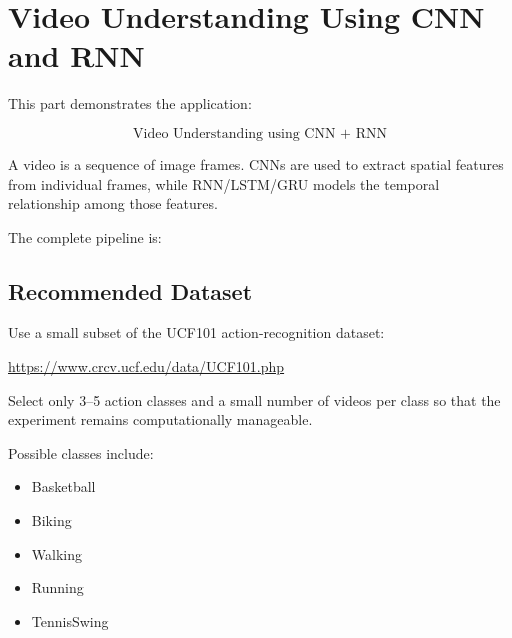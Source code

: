 \documentclass[10pt]{article}
\begin{document}
\section{Video Understanding Using CNN and RNN}

This part demonstrates the application:

\[
\boxed{\text{Video Understanding using CNN + RNN}}
\]

A video is a sequence of image frames. CNNs are used to extract spatial
features from individual frames, while RNN/LSTM/GRU models the temporal
relationship among those features.

The complete pipeline is:

\begin{center}
\end{center}

\subsection{Recommended Dataset}

Use a small subset of the UCF101 action-recognition dataset:

\url{https://www.crcv.ucf.edu/data/UCF101.php}

Select only 3--5 action classes and a small number of videos per class so that
the experiment remains computationally manageable.

Possible classes include:

\begin{itemize}
\item Basketball
\item Biking
\item Walking
\item Running
\item TennisSwing
\end{itemize}
\end{document}
